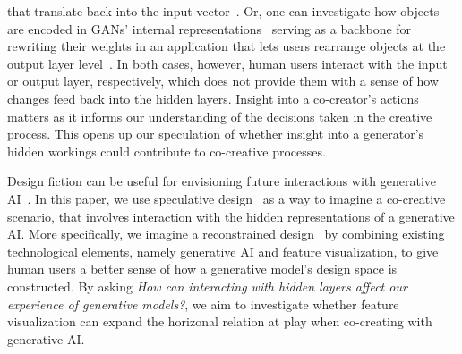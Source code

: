 \documentclass[manuscript]{acmart}
\begin{document}
that translate back into the input vector~\cite{zaltron_cg-gan_2020}. Or, one can investigate how objects are encoded in GANs' internal representations~\cite{bau_gan_2019} serving as a backbone for rewriting their weights in an application that lets users rearrange objects at the output layer level~\cite{bau_rewriting_2020}. 
In both cases, however, human users interact with the input or output layer, respectively, which does not provide them with a sense of how changes feed back into the hidden layers.
Insight into a co-creator's actions matters as it informs our understanding of the decisions taken in the creative process. 
This opens up our speculation of whether insight into a generator's hidden workings could contribute to co-creative processes.

Design fiction can be useful for 
envisioning future interactions with generative AI~\cite{yildirim_emergent_2022,muller_drinking_2022}. 
In this paper, we use speculative design~\cite{auger_speculative_2013} as a way to imagine a co-creative scenario, that involves interaction with the hidden representations of a generative AI. 
More specifically, we imagine a reconstrained design~\cite{auger_reconstrained_2017} by combining existing technological elements, namely generative AI and feature visualization, to give human users a better sense of how a generative model's design space is constructed.
By asking 
\textit{How can interacting with hidden layers affect our experience of generative models?}, 
we aim to investigate whether 
feature visualization can expand the horizonal relation at play when co-creating with generative AI.

\end{document}
